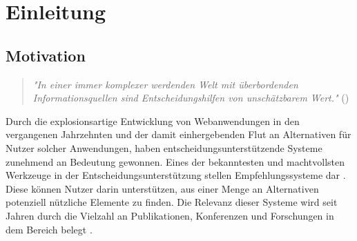\chapter{Einleitung}
\label{ch:intro}

\section{Motivation}
\label{sec:einleitungmotivation}

\begin{quotation}
    \textit{"In einer immer komplexer werdenden Welt mit überbordenden Informationsquellen sind Entscheidungshilfen von unschätzbarem Wert."} (\textcite[S. vii]{klahold:book})
\end{quotation}

Durch die explosionsartige Entwicklung von Webanwendungen in den vergangenen Jahrzehnten und der damit einhergebenden Flut an Alternativen für Nutzer solcher Anwendungen, haben entscheidungsunterstützende Systeme zunehmend an Bedeutung gewonnen.
Eines der bekanntesten und machtvollsten Werkzeuge in der Entscheidungsunterstützung stellen Empfehlungssysteme dar \cite[S. vii]{ricci:inbook}.
Diese können Nutzer darin unterstützen, aus einer Menge an Alternativen potenziell nützliche Elemente zu finden.
Die Relevanz dieser Systeme wird seit Jahren durch die Vielzahl an Publikationen, Konferenzen und Forschungen in dem Bereich belegt \cite[S. vii]{klahold:book}.


